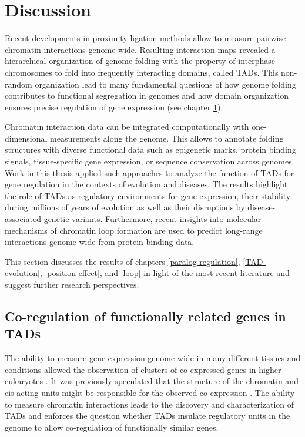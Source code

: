 \documentclass[a4paper,twoside=true,openright,parskip=full,chapterprefix=true,11pt,headings=normal,bibliography=totoc,listof=totoc,titlepage=on,captions=tableabove,draft=false]{scrreprt}
\theoremstyle{definition}
\theoremstyle{definition}
\theoremstyle{definition}
\theoremstyle{remark}
\begin{document}
\hypertarget{thesis-discussion}{%
\chapter{Discussion}\label{thesis-discussion}}

Recent developments in proximity-ligation methods allow to measure
pairwise chromatin interactions genome-wide. Resulting interaction maps
revealed a hierarchical organization of genome folding with the property
of interphase chromosomes to fold into frequently interacting domains,
called TADs. This non-random organization lead to many fundamental
questions of how genome folding contributes to functional segregation in
genomes and how domain organization ensures precise regulation of gene
expression (see chapter \protect\hyperlink{intro}{1}).

Chromatin interaction data can be integrated computationally with
one-dimensional measurements along the genome. This allows to annotate
folding structures with diverse functional data such as epigenetic
marks, protein binding signals, tissue-specific gene expression, or
sequence conservation across genomes. Work in this thesis applied such
approaches to analyze the function of TADs for gene regulation in the
contexts of evolution and diseases. The results highlight the role of
TADs as regulatory environments for gene expression, their stability
during millions of years of evolution as well as their disruptions by
disease-associated genetic variants. Furthermore, recent insights into
molecular mechanisms of chromatin loop formation are used to predict
long-range interactions genome-wide from protein binding data.

This section discusses the results of chapters \ref{paralog-regulation},
\ref{TAD-evolution}, \ref{position-effect}, and \ref{loop} in light of
the most recent literature and suggest further research perspectives.

\hypertarget{co-regulation-of-functionally-related-genes-in-tads}{%
\section{Co-regulation of functionally related genes in
TADs}\label{co-regulation-of-functionally-related-genes-in-tads}}

The ability to measure gene expression genome-wide in many different
tissues and conditions allowed the observation of clusters of
co-expressed genes in higher eukaryotes
\citep{Boutanaev2002, Purmann2007}. It was previously speculated that
the structure of the chromatin and cis-acting units might be responsible
for the observed co-expression \citep{Sproul2005, Purmann2007}. The
ability to measure chromatin interactions leads to the discovery and
characterization of TADs and enforces the question whether TADs insulate
regulatory units in the genome to allow co-regulation of functionally
similar genes.
\end{document}
